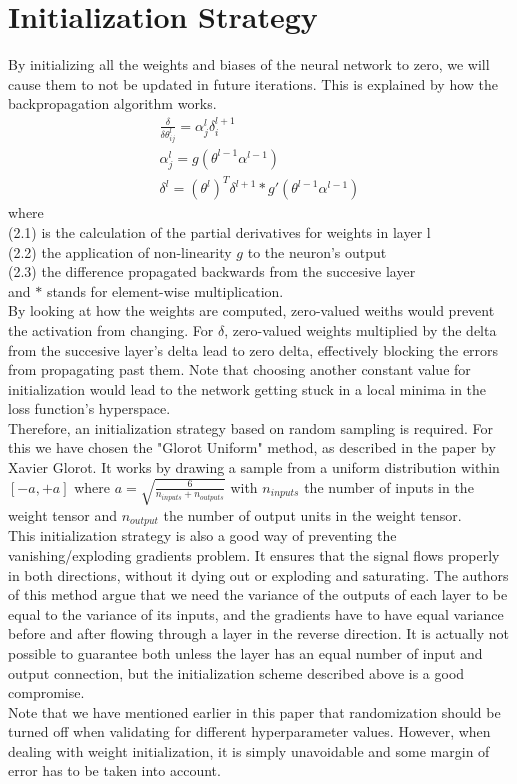 \section{Initialization Strategy}
By initializing all the weights and biases of the neural network to zero, we will cause them to not be updated in future iterations. This is explained by how the backpropagation algorithm works.
\begin{align}
\frac{\delta}{\delta\theta_{ij}^l}=\alpha_j^l\delta_i^{l+1}\\
\alpha_j^l=g(\theta^{l-1}\alpha^{l-1})\\
\delta^l=(\theta^l)^T\delta^{l+1}*g'(\theta^{l-1}\alpha^{l-1})
\end{align} 
where \\
\tab(2.1) is the calculation of the partial derivatives for weights in layer l\\
\tab(2.2) the application of non-linearity $g$ to the neuron's output\\
\tab(2.3) the difference propagated backwards from the succesive layer\\
and $*$ stands for element-wise multiplication.\\
By looking at how the weights are computed, zero-valued weiths would prevent the activation from changing. For $\delta$, zero-valued weights multiplied by the delta from the succesive layer's delta lead to zero delta, effectively blocking the errors from propagating past them. Note that choosing another constant value for initialization would lead to the network getting stuck in a local minima in the loss function's hyperspace.\\
Therefore, an initialization strategy based on random sampling is required. For this we have chosen the "Glorot Uniform" method, as described in the paper by Xavier Glorot\cite{glorotPaper}. It works by drawing a sample from a uniform distribution within $[-a,+a]$ where $a=\sqrt{\frac{6}{n_{inputs}+n_{outputs}}}$ with $n_{inputs}$ the number of inputs in the weight tensor and $n_{output}$ the number of output units in the weight tensor.\\
This initialization strategy is also a good way of preventing the vanishing/exploding gradients problem. It ensures that the signal flows properly in both directions, without it dying out or exploding and saturating. The authors of this method argue that we need the variance of the outputs of each layer to be equal to the variance of its inputs, and the gradients have to have equal variance before and after flowing through a layer in the reverse direction. It is actually not possible to guarantee both unless the layer has an equal number of input and output connection, but the initialization scheme described above is a good compromise.\\
Note that we have mentioned earlier in this paper that randomization should be turned off when validating for different hyperparameter values. However, when dealing with weight initialization, it is simply unavoidable and some margin of error has to be taken into account.

